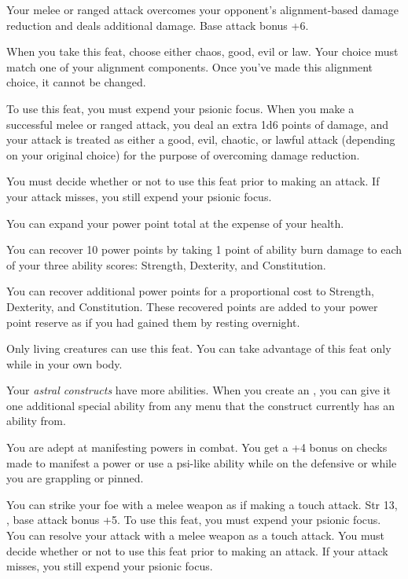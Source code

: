 
{Your melee or ranged attack overcomes your opponent's alignment-based damage reduction and deals additional damage.}
{Base attack bonus +6.}
{When you take this feat, choose either chaos, good, evil or law. Your choice must match one of your alignment components. Once you've made this alignment choice, it cannot be changed.

To use this feat, you must expend your psionic focus. When you make a successful melee or ranged attack, you deal an extra 1d6 points of damage, and your attack is treated as either a good, evil, chaotic, or lawful attack (depending on your original choice) for the purpose of overcoming damage reduction.

You must decide whether or not to use this feat prior to making an attack. If your attack misses, you still expend your psionic focus.}
{}{}

{You can expand your power point total at the expense of your health.}
{}
{You can recover 10 power points by taking 1 point of ability burn damage to each of your three ability scores: Strength, Dexterity, and Constitution.

You can recover additional power points for a proportional cost to Strength, Dexterity, and Constitution. These recovered points are added to your power point reserve as if you had gained them by resting overnight.}
{}
{Only living creatures can use this feat. You can take advantage of this feat only while in your own body.}

{Your \emph{astral constructs} have more abilities.}
{}
{When you create an , you can give it one additional special ability from any menu that the construct currently has an ability from.}
{}{}

{You are adept at manifesting powers in combat.}
{}
{You get a +4 bonus on  checks made to manifest a power or use a psi-like ability while on the defensive or while you are grappling or pinned.}
{}{}

{You can strike your foe with a melee weapon as if making a touch attack.}
{Str 13, , base attack bonus +5.}
{To use this feat, you must expend your psionic focus. You can resolve your attack with a melee weapon as a touch attack. You must decide whether or not to use this feat prior to making an attack. If your attack misses, you still expend your psionic focus.}
{}{}

